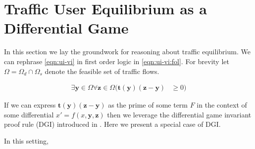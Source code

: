\section{Traffic User Equilibrium as a Differential Game}

In this section we lay the groundwork for reasoning about traffic equilibrium. 
We can rephrase \eqref{eqn:ui-vi} in first order logic in \eqref{eqn:ui-vi:fol}.
For brevity let $\Omega = \Omega_d \cap \Omega_s$ denote the feasible set of traffic flows.

\begin{align}
    \exists \mathbf{y}\in \Omega \forall \mathbf{z}\in \Omega (\mathbf{t}(\mathbf{y})(\mathbf{z}- \mathbf{y}) &\geq 0) \label{eqn:ui-vi:fol}
\end{align}

If we can express $\mathbf{t}(\mathbf{y})(\mathbf{z}- \mathbf{y})$ as the prime of some term $F$ in the context of some differential $x'=f(x,\mathbf{y},\mathbf{z})$ then we leverage the differential game invariant proof rule (DGI) introduced in \citet{DBLP:journals/tocl/Platzer17}.
Here we present a special case of DGI.

\begin{prooftree}
\end{prooftree}

In this setting,


